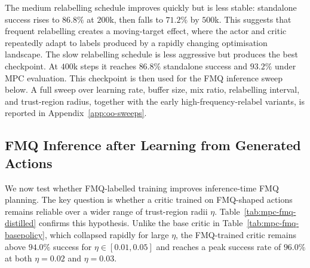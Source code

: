 The medium relabelling schedule improves quickly but is less stable:
standalone success rises to $86.8\%$ at $200$k, then falls to
$71.2\%$ by $500$k. This suggests that frequent relabelling creates a
moving-target effect, where the actor and critic repeatedly adapt to
labels produced by a rapidly changing optimisation landscape.
The slow relabelling schedule is less aggressive but produces the best
checkpoint. At $400$k steps it reaches $86.8\%$ standalone success and
$93.2\%$ under MPC evaluation. This checkpoint is then used for the FMQ inference sweep below.
A full sweep over learning rate, buffer size, mix ratio, relabelling
interval, and trust-region radius, together with the early
high-frequency-relabel variants, is reported in
Appendix~\ref{app:oo-sweeps}.

\subsection{FMQ Inference after Learning from Generated Actions}
\label{sec:exp-fmq-distil-inf}

We now test whether FMQ-labelled training improves inference-time FMQ
planning. The key question is whether a critic trained on FMQ-shaped
actions remains reliable over a wider range of trust-region radii
$\eta$.
Table~\ref{tab:mpc-fmq-distilled} confirms this hypothesis. Unlike the
base critic in Table~\ref{tab:mpc-fmq-basepolicy}, which collapsed
rapidly for large $\eta$, the FMQ-trained critic remains above
$94.0\%$ success for $\eta \in [0.01,0.05]$ and reaches a peak success
rate of $96.0\%$ at both $\eta=0.02$ and $\eta=0.03$.

